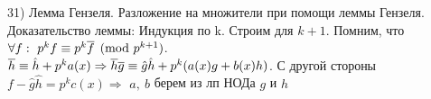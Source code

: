 31) Лемма Гензеля. Разложение на множители при помощи леммы Гензеля.\\
    Доказательство леммы: Индукция по k. Строим для $k + 1$. Помним, что $\forall f:~p^{k}f \equiv p^{k}\overline{f} \pmod{p^{k + 1}}$.\\
    $\overline{h} \equiv \hat{h}+p^ka(x) \Rightarrow \overline{h}\overline{g} \equiv \hat{g}\hat{h} + p^{k}(a(x)g + b(x)h)$. С другой стороны $f-\hat{g}\hat{h}=p^kc(x) \Rightarrow$ $a,~b$ берем из лп НОДа $g$ и $h$\\
